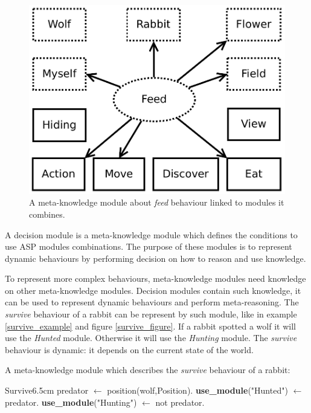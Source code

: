\documentclass{aamas2012}
\begin{document}
	\begin{figure}
		\centering
		\includegraphics[keepaspectratio=true, scale=0.4]{feed.pdf}
		\caption
		{
			\label{feed_figure}
			A meta-knowledge module about \emph{feed} behaviour linked to modules it combines.
		}
	\end{figure}
	
	\begin{definition}
		A decision module is a meta-knowledge module which defines the conditions to use ASP modules combinations.	
		The purpose of these modules is to represent dynamic behaviours by performing decision on how to reason and use knowledge.
	\end{definition}
	
	To represent more complex behaviours, meta-knowledge modules need knowledge on other meta-knowledge modules.
	Decision modules contain such knowledge, it can be used to represent dynamic behaviours and perform meta-reasoning.
	The \emph{survive} behaviour of a rabbit can be represent by such module, like in example \ref{survive_example} and figure \ref{survive_figure}.
	If a rabbit spotted a wolf it will use the \emph{Hunted} module. Otherwise it will use the \emph{Hunting} module.
	The \emph{survive} behaviour is dynamic: it depends on the current state of the world.
	
	\begin{example}
		\label{survive_example}
		A meta-knowledge module which describes the \emph{survive} behaviour of a rabbit:\newline
		\begin{module}{Survive}{6.5cm}
			predator $\leftarrow$ position(wolf,Position).\newline
			\textbf{use\_module}("Hunted") $\leftarrow$ predator.\newline
			\textbf{use\_module}("Hunting") $\leftarrow$ not predator.
		\end{module}
	\end{example}
	
\end{document}
